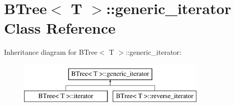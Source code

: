 \hypertarget{classBTree_1_1generic__iterator}{
\section{BTree$<$ T $>$::generic\_\-iterator Class Reference}
\label{classBTree_1_1generic__iterator}
}
Inheritance diagram for BTree$<$ T $>$::generic\_\-iterator:\begin{figure}[H]
\begin{center}
\leavevmode
\includegraphics[height=2.000000cm]{classBTree_1_1generic__iterator}
\end{center}
\end{figure}
